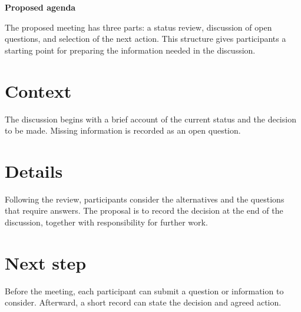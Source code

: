 \def\lakitlanguageprofile{english}
\def\lakitmainlanguage{english}
\def\lakitdocumentclass{article}
\def\lakitclassoptions{11pt,a4paper}
\def\lakitgeometryoptions{margin=2.2cm,headheight=14pt}
\def\lakitlinespread{1.18}
\def\lakitparagraphstyle{block}




{\LARGE\sffamily\bfseries\noindent Proposed agenda\par}\medskip
The proposed meeting has three parts: a status review, discussion of open
questions, and selection of the next action. This structure gives participants
a starting point for preparing the information needed in the discussion.
\section{Context}
The discussion begins with a brief account of the current status and the
decision to be made. Missing information is recorded as an open question.
\section{Details}
Following the review, participants consider the alternatives and the questions
that require answers. The proposal is to record the decision at the end of the
discussion, together with responsibility for further work.
\section{Next step}
Before the meeting, each participant can submit a question or information to
consider. Afterward, a short record can state the decision and agreed action.

